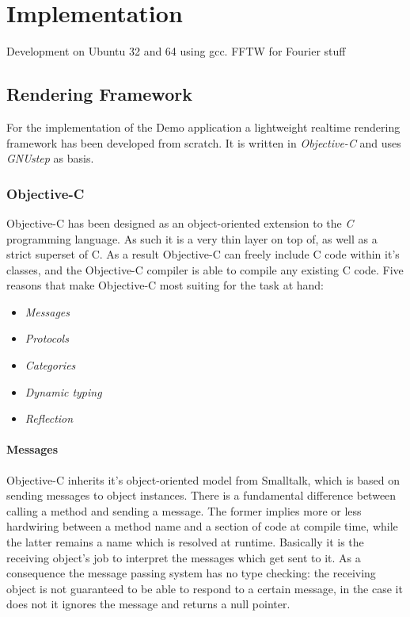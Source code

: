 \chapter{Implementation}

Development on Ubuntu 32 and 64 using gcc.
FFTW for Fourier stuff

\section{Rendering Framework}

For the implementation of the Demo application a lightweight realtime
rendering framework has been developed from scratch. It is written in
\textit{Objective-C} and uses \textit{GNUstep} as basis.

\subsection{Objective-C}

Objective-C has been designed as an object-oriented extension to the
\textit{C} programming language. As such it is a very thin layer on top of, as
well as a strict superset of C. As a result Objective-C can freely include C
code within it's classes, and the Objective-C compiler is able to compile any
existing C code. Five reasons that make Objective-C most suiting for the task
at hand:

\begin{itemize}
 \item \textit{Messages}
 \item \textit{Protocols}
 \item \textit{Categories}
 \item \textit{Dynamic typing}
 \item \textit{Reflection}
\end{itemize}

\subsubsection{Messages}
Objective-C inherits it's object-oriented model from Smalltalk, which is based
on sending messages to object instances. There is a fundamental difference
between calling a method and sending a message. The former implies more or less
hardwiring between a method name and a section of code at compile time, while
the latter remains a name which is resolved at runtime. Basically it is the
receiving object's job to interpret the messages which get sent to it. As a
consequence the message passing system has no type checking: the receiving
object is not guaranteed to be able to respond to a certain message, in the
case it does not it ignores the message and returns a null pointer.

